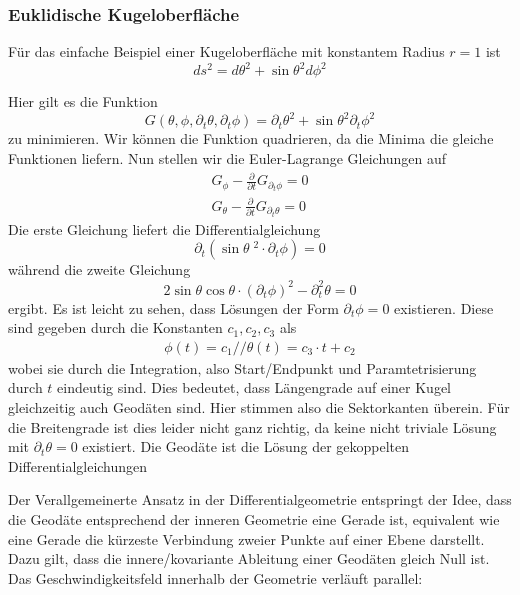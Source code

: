 \documentclass{article}
\begin{document}
\subsubsection*{Euklidische Kugeloberfläche}
Für das einfache Beispiel einer Kugeloberfläche mit konstantem Radius $r=1$ ist
\begin{equation}
ds^2=d\theta^2+\sin{\theta}^2d\phi^2 
\end{equation}

Hier gilt es die Funktion 
\begin{equation}
G(\theta,\phi,\partial_t\theta,\partial_t\phi)=\partial_t\theta^2+\sin{\theta}^2\partial_t\phi^2
\end{equation}
zu minimieren. Wir können die Funktion quadrieren, da die Minima die gleiche Funktionen liefern. Nun stellen wir die Euler-Lagrange Gleichungen auf 
\begin{eqnarray}
G_\phi-\frac{\partial}{\partial t}G_{\partial_t \phi}=0 \\
G_\theta-\frac{\partial}{\partial t}G_{\partial_t \theta}=0
\end{eqnarray}
Die erste Gleichung liefert die Differentialgleichung
\begin{equation}
\partial_t(\sin{\theta}\;^2\cdot \partial_t \phi)=0
\end{equation}
während die zweite Gleichung 
\begin{equation}
2\sin{\theta}\cos{\theta}\cdot (\partial_t \phi)^2-\partial_t^2\theta=0
\end{equation}
ergibt. Es ist leicht zu sehen, dass Lösungen der Form $\partial_t \phi=0$ existieren. Diese sind gegeben durch die Konstanten $c_1,c_2,c_3$ als
\begin{eqnarray}
\phi(t)=c_1 //
\theta(t)=c_3\cdot t +c_2
\end{eqnarray}
wobei sie durch die Integration, also Start/Endpunkt und Paramtetrisierung durch $t$ eindeutig sind. Dies bedeutet, dass Längengrade auf einer Kugel gleichzeitig auch Geodäten sind. Hier stimmen also die Sektorkanten überein. Für die Breitengrade ist dies leider nicht ganz richtig, da keine nicht triviale Lösung mit $\partial_t\theta=0$ existiert. Die Geodäte ist die Lösung der gekoppelten Differentialgleichungen

Der Verallgemeinerte Ansatz in der Differentialgeometrie entspringt der Idee, dass die Geodäte entsprechend der inneren Geometrie eine Gerade ist, equivalent wie eine Gerade die kürzeste Verbindung zweier Punkte auf einer Ebene darstellt. Dazu gilt, dass die innere/kovariante Ableitung einer Geodäten gleich Null ist. Das Geschwindigkeitsfeld innerhalb der Geometrie verläuft parallel:
\end{document}
